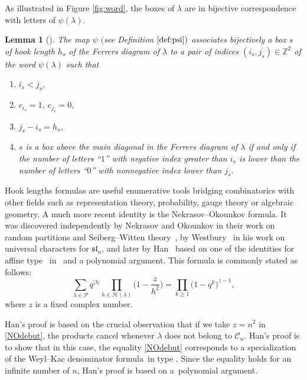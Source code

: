 \documentclass[10pt,a4paper]{amsart}
\newtheorem{Lemma}[Theorem]{Lemma}
\numberwithin{equation}{section}
\def\cch{\mathcal H}
\def\ccp{\mathcal P}
\newcommand{\Z}{\mathbb{Z}}
\begin{document}
As illustrated in Figure \ref{fig:word}, the boxes of $\lambda$ are in bijective correspondence with letters of $\psi(\lambda)$.
\begin{Lemma}[{\cite[Lemma $2.1$]{Wmac}}]\label{lem:indices}
The map $\psi$ $($see Definition $\ref{def:psi})$ associates bijectively a box $s$ of hook length $h_s$ of the Ferrers diagram of $\lambda$ to a pair of indices $(i_s,j_s)\in\Z^2$ of the word $\psi(\lambda)$ such that
\begin{enumerate}\itemsep=0pt
\item[$(1)$] $i_s<j_s$,
\item[$(2)$] $c_{i_s}=1$, $c_{j_s}=0$,
\item[$(3)$] $j_s-i_s=h_s$,
\item[$(4)$] $s$ is a box above the main diagonal in the Ferrers diagram of $\lambda$ if and only if the number of letters {\rm ``$1$''} with negative index greater than $i_s$ is lower than the number of letters {\rm ``$0$''} with nonnegative index lower than $j_s$.
\end{enumerate}
\end{Lemma}


Hook lengths formulas are useful enumerative tools bridging combinatorics with other fields such as representation theory, probability, gauge theory or algebraic geometry. A much more recent identity is the Nekrasov--Okounkov formula. It was discovered independently by Nekrasov and Okounkov in their work on random partitions and Seiberg--Witten theory~\cite{NO}, by Westbury~\cite{We} in his work on universal characters for $\mathfrak{sl}_n$, and later by Han~\cite{Ha} based on one of the identities for affine type ~in~\cite[Appendix $1$]{Mac} and a polynomial argument. This formula is commonly stated as follows:
\begin{equation*}
\sum_{\lambda\in\ccp}q^{\lvert \lambda\rvert}\prod_{h\in\cch(\lambda)}\biggl(1-\frac{z}{h^2}\biggr)=\prod_{k\geq 1}\bigl(1-q^k\bigr)^{z-1},
\end{equation*}
where $z$ is a fixed complex number.

Han's proof is based on the crucial observation that if we take $z=n^2$ in \eqref{NOdebut}, the products \smash{$\prod_{h\in\cch(\lambda)}\bigl(1-\frac{n^2}{h^2}\bigr)$} cancel whenever $\lambda$ does not belong to $\mathcal{C}_n$. Han's proof is to show that in this case, the equality \eqref{NOdebut} corresponds to a specialization of the Weyl--Kac denominator formula~in type . Since the equality holds for an infinite number of $n$, Han's proof is based on a~polynomial argument.
\end{document}
